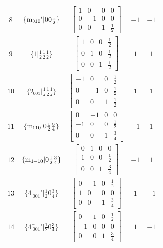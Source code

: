 \documentclass[fleqn,8pt]{jsarticle}
\begin{document}
\begin{longtable}{ccccc}
$ 8 $ & $ \{{\rm m}_{010}{}'|0 0 \frac{1}{2}\} $ & $ \begin{bmatrix} 1 & 0 & 0 & 0 \\ 0 & -1 & 0 & 0 \\ 0 & 0 & 1 & \frac{1}{2} \end{bmatrix} $ & $ -1 $ & $ -1 $ \\ \hline
$ 9 $ & $ \{1|\frac{1}{2} \frac{1}{2} \frac{1}{2}\} $ & $ \begin{bmatrix} 1 & 0 & 0 & \frac{1}{2} \\ 0 & 1 & 0 & \frac{1}{2} \\ 0 & 0 & 1 & \frac{1}{2} \end{bmatrix} $ & $ 1 $ & $ 1 $ \\ \hline
$ 10 $ & $ \{2{}_{001}|\frac{1}{2} \frac{1}{2} \frac{1}{2}\} $ & $ \begin{bmatrix} -1 & 0 & 0 & \frac{1}{2} \\ 0 & -1 & 0 & \frac{1}{2} \\ 0 & 0 & 1 & \frac{1}{2} \end{bmatrix} $ & $ 1 $ & $ 1 $ \\ \hline
$ 11 $ & $ \{{\rm m}_{110}|0 \frac{1}{2} \frac{3}{4}\} $ & $ \begin{bmatrix} 0 & -1 & 0 & 0 \\ -1 & 0 & 0 & \frac{1}{2} \\ 0 & 0 & 1 & \frac{3}{4} \end{bmatrix} $ & $ -1 $ & $ 1 $ \\ \hline
$ 12 $ & $ \{{\rm m}_{1-10}|0 \frac{1}{2} \frac{3}{4}\} $ & $ \begin{bmatrix} 0 & 1 & 0 & 0 \\ 1 & 0 & 0 & \frac{1}{2} \\ 0 & 0 & 1 & \frac{3}{4} \end{bmatrix} $ & $ -1 $ & $ 1 $ \\ \hline
$ 13 $ & $ \{4^{+}_{\,\,001}{}'|\frac{1}{2} 0 \frac{3}{4}\} $ & $ \begin{bmatrix} 0 & -1 & 0 & \frac{1}{2} \\ 1 & 0 & 0 & 0 \\ 0 & 0 & 1 & \frac{3}{4} \end{bmatrix} $ & $ 1 $ & $ -1 $ \\ \hline
$ 14 $ & $ \{4^{-}_{\,\,001}{}'|\frac{1}{2} 0 \frac{3}{4}\} $ & $ \begin{bmatrix} 0 & 1 & 0 & \frac{1}{2} \\ -1 & 0 & 0 & 0 \\ 0 & 0 & 1 & \frac{3}{4} \end{bmatrix} $ & $ 1 $ & $ -1 $ \\ \hline

\end{longtable}
\end{document}
